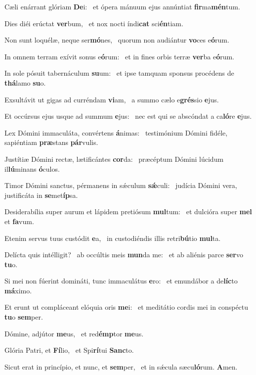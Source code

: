 \item Cæli enárrant glóriam \textbf{De}i:~\psstar{} et ópera mánuum ejus annúntiat \textbf{fir}ma\textbf{mén}tum.
\item Dies diéi erúctat \textbf{ver}bum,~\psstar{} et nox nocti índi\textbf{cat} sci\textbf{én}tiam.
\item Non sunt loquélæ, neque ser\textbf{mó}nes,~\psstar{} quorum non audiántur \textbf{vo}ces e\textbf{ó}rum.
\item In omnem terram exívit sonus e\textbf{ó}rum:~\psstar{} et in fines orbis terræ \textbf{ver}ba e\textbf{ó}rum.
\item In sole pósuit tabernáculum \textbf{su}um:~\psstar{} et ipse tamquam sponsus procédens de \textbf{thá}lamo \textbf{su}o.
\item Exsultávit ut gigas ad curréndam \textbf{vi}am,~\psstar{} a summo cælo e\textbf{grés}sio \textbf{e}jus.
\item Et occúrsus ejus usque ad summum \textbf{e}jus:~\psstar{} nec est qui se abscóndat a ca\textbf{ló}re \textbf{e}jus.
\item Lex Dómini immaculáta, convértens \textbf{á}nimas:~\psstar{} testimónium Dómini fidéle, sapiéntiam \textbf{præ}stans \textbf{pár}vulis.
\item Justítiæ Dómini rectæ, lætificántes \textbf{cor}da:~\psstar{} præcéptum Dómini lúcidum il\textbf{lú}minans \textbf{ó}culos.
\item Timor Dómini sanctus, pérmanens in sǽculum \textbf{sǽ}culi:~\psstar{} judícia Dómini vera, justificáta in \textbf{se}met\textbf{íp}sa.
\item Desiderabília super aurum et lápidem pretiósum \textbf{mul}tum:~\psstar{} et dulcióra super \textbf{mel} et \textbf{fa}vum.
\item Etenim servus tuus custódit \textbf{e}a,~\psstar{} in custodiéndis illis retri\textbf{bú}tio \textbf{mul}ta.
\item Delícta quis intélligit?~\pscross{} ab occúltis meis \textbf{mun}da me:~\psstar{} et ab aliénis parce \textbf{ser}vo \textbf{tu}o.
\item Si mei non fúerint domináti, tunc immaculátus \textbf{e}ro:~\psstar{} et emundábor a de\textbf{líc}to \textbf{má}ximo.
\item Et erunt ut compláceant elóquia oris \textbf{me}i:~\psstar{} et meditátio cordis mei in conspéctu \textbf{tu}o \textbf{sem}per.
\item Dómine, adjútor \textbf{me}us,~\psstar{} et red\textbf{émp}tor \textbf{me}us.
\item Glória Patri, et \textbf{Fí}lio,~\psstar{} et Spi\textbf{rí}tui \textbf{Sanc}to.
\item Sicut erat in princípio, et nunc, et \textbf{sem}per,~\psstar{} et in sǽcula sæcu\textbf{ló}rum. \textbf{A}men.
